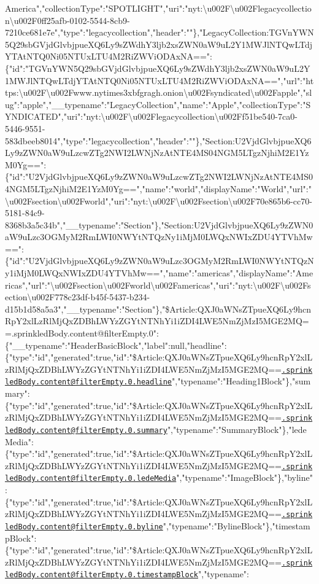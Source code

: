 America","collectionType":"SPOTLIGHT","uri":"nyt:\textbackslash{}u002F\textbackslash{}u002Flegacycollection\textbackslash{}u002F0ff25afb-0102-5544-8cb9-7210ce681e7e","type":"legacycollection","header":""\},"LegacyCollection:TGVnYWN5Q29sbGVjdGlvbjpueXQ6Ly9sZWdhY3ljb2xsZWN0aW9uL2Y1MWJlNTQwLTdjYTAtNTQ0Ni05NTUxLTU4M2RiZWViODAxNA==":\{"id":"TGVnYWN5Q29sbGVjdGlvbjpueXQ6Ly9sZWdhY3ljb2xsZWN0aW9uL2Y1MWJlNTQwLTdjYTAtNTQ0Ni05NTUxLTU4M2RiZWViODAxNA==","url":"https:\textbackslash{}u002F\textbackslash{}u002Fwww.nytimes3xbfgragh.onion\textbackslash{}u002Fsyndicated\textbackslash{}u002Fapple","slug":"apple","\_\_typename":"LegacyCollection","name":"Apple","collectionType":"SYNDICATED","uri":"nyt:\textbackslash{}u002F\textbackslash{}u002Flegacycollection\textbackslash{}u002Ff51be540-7ca0-5446-9551-583dbeeb8014","type":"legacycollection","header":""\},"Section:U2VjdGlvbjpueXQ6Ly9zZWN0aW9uLzcwZTg2NWI2LWNjNzAtNTE4MS04NGM5LTgzNjhiM2E1YzM0Yg==":\{"id":"U2VjdGlvbjpueXQ6Ly9zZWN0aW9uLzcwZTg2NWI2LWNjNzAtNTE4MS04NGM5LTgzNjhiM2E1YzM0Yg==","name":"world","displayName":"World","url":"\textbackslash{}u002Fsection\textbackslash{}u002Fworld","uri":"nyt:\textbackslash{}u002F\textbackslash{}u002Fsection\textbackslash{}u002F70e865b6-cc70-5181-84c9-8368b3a5c34b","\_\_typename":"Section"\},"Section:U2VjdGlvbjpueXQ6Ly9zZWN0aW9uLzc3OGMyM2RmLWI0NWYtNTQzNy1iMjM0LWQxNWIxZDU4YTVhMw==":\{"id":"U2VjdGlvbjpueXQ6Ly9zZWN0aW9uLzc3OGMyM2RmLWI0NWYtNTQzNy1iMjM0LWQxNWIxZDU4YTVhMw==","name":"americas","displayName":"Americas","url":"\textbackslash{}u002Fsection\textbackslash{}u002Fworld\textbackslash{}u002Famericas","uri":"nyt:\textbackslash{}u002F\textbackslash{}u002Fsection\textbackslash{}u002F778c23df-b45f-5437-b234-d15b1d58a5a3","\_\_typename":"Section"\},"\$Article:QXJ0aWNsZTpueXQ6Ly9hcnRpY2xlLzRlMjQxZDBhLWYzZGYtNTNhYi1iZDI4LWE5NmZjMzI5MGE2MQ==.sprinkledBody.content@filterEmpty.0":\{"\_\_typename":"HeaderBasicBlock","label":null,"headline":\{"type":"id","generated":true,"id":"\$Article:QXJ0aWNsZTpueXQ6Ly9hcnRpY2xlLzRlMjQxZDBhLWYzZGYtNTNhYi1iZDI4LWE5NmZjMzI5MGE2MQ==\href{mailto:.sprinkledBody.content@filterEmpty.0.headline}{\nolinkurl{.sprinkledBody.content@filterEmpty.0.headline}}","typename":"Heading1Block"\},"summary":\{"type":"id","generated":true,"id":"\$Article:QXJ0aWNsZTpueXQ6Ly9hcnRpY2xlLzRlMjQxZDBhLWYzZGYtNTNhYi1iZDI4LWE5NmZjMzI5MGE2MQ==\href{mailto:.sprinkledBody.content@filterEmpty.0.summary}{\nolinkurl{.sprinkledBody.content@filterEmpty.0.summary}}","typename":"SummaryBlock"\},"ledeMedia":\{"type":"id","generated":true,"id":"\$Article:QXJ0aWNsZTpueXQ6Ly9hcnRpY2xlLzRlMjQxZDBhLWYzZGYtNTNhYi1iZDI4LWE5NmZjMzI5MGE2MQ==\href{mailto:.sprinkledBody.content@filterEmpty.0.ledeMedia}{\nolinkurl{.sprinkledBody.content@filterEmpty.0.ledeMedia}}","typename":"ImageBlock"\},"byline":\{"type":"id","generated":true,"id":"\$Article:QXJ0aWNsZTpueXQ6Ly9hcnRpY2xlLzRlMjQxZDBhLWYzZGYtNTNhYi1iZDI4LWE5NmZjMzI5MGE2MQ==\href{mailto:.sprinkledBody.content@filterEmpty.0.byline}{\nolinkurl{.sprinkledBody.content@filterEmpty.0.byline}}","typename":"BylineBlock"\},"timestampBlock":\{"type":"id","generated":true,"id":"\$Article:QXJ0aWNsZTpueXQ6Ly9hcnRpY2xlLzRlMjQxZDBhLWYzZGYtNTNhYi1iZDI4LWE5NmZjMzI5MGE2MQ==\href{mailto:.sprinkledBody.content@filterEmpty.0.timestampBlock}{\nolinkurl{.sprinkledBody.content@filterEmpty.0.timestampBlock}}","typename":